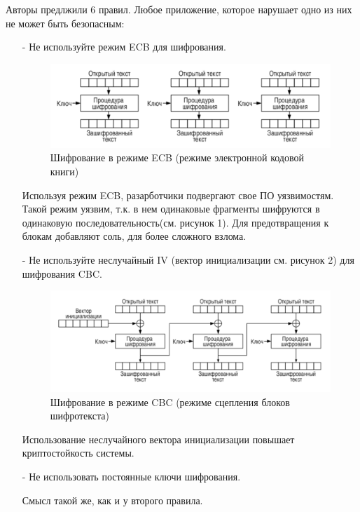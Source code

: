\documentclass[11pt, a4paper]{article}		%
\begin{document}
Авторы предлжили 6 правил. Любое приложение, которое нарушает одно из них не может быть безопасным:

\begin{itemize}

\item[-] Не используйте режим ECB для шифрования. 

\begin{figure}[h!]
	\centering
	\includegraphics[scale=0.80]{res/ecb_mode}
	\caption{Шифрование в режиме ECB (режиме электронной кодовой книги)}
\end{figure}

Используя режим ECB, разарботчики подвергают свое ПО уязвимостям. Такой режим уязвим, т.к. в нем одинаковые фрагменты шифруются в одинаковую последовательность(см. рисунок 1). Для предотвращения к блокам добавляют соль, для более сложного взлома.

\item[-] Не используйте неслучайный IV (вектор инициализации см. рисунок 2) для шифрования CBC.

\begin{figure}[h!]
	\centering
	\includegraphics[scale=0.80]{res/cbc_mode}
	\caption{Шифрование в режиме CBC (режиме сцепления блоков шифротекста)}
\end{figure}

Использование неслучайного вектора инициализации повышает криптостойкость системы.

\item[-] Не использовать постоянные ключи шифрования.

Смысл такой же, как и у второго правила.


\end{itemize}
\end{document}
